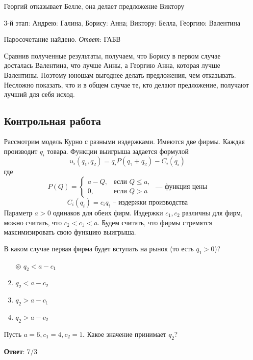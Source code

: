 	Георгий отказывает Белле, она делает предложение Виктору
	
	3-й этап: Андрею: Галина, Борису: Анна; Виктору: Белла, Георгию: Валентина
	
	Паросочетание найдено. \textit{Ответ}: ГАБВ
	
	Сравнив полученные результаты, получаем, что Борису в первом случае досталась Валентина, что лучше Анны, а Георгию Анна, которая лучше Валентины. Поэтому юношам выгоднее делать предложения, чем отказывать. Несложно показать, что и в общем случае те, кто делают предложение, получают лучший для себя исход.
	
	
	
	
	
	
	
\subsection{Контрольная работа}

\task
Рассмотрим модель Курно с разными издержками. Имеются две фирмы. Каждая производит $q_i$ товара. Функции выигрыша задается формулой
\[
	u_i (q_1, q_2) = q_i P(q_1 + q_2) - C_i (q_i)
\]
где
\[
P(Q) =
	\begin{cases}
	a - Q, & \text{если } Q \leq a, \\
	0, & \text{если } Q > a
	\end{cases} \text{ --- функция цены}
\]
\[
	C_i (q_i) = c_i q_i \text{ -- издержки производства}
\]
Параметр $a > 0$ одинаков для обеих фирм. Издержки $c_1, c_2$ различны для фирм, можно считать, что $c_2 < c_1 < a$. Будем считать, что фирмы стремятся максимизировать свою функцию выигрыша.

В каком случае первая фирма будет вступать на рынок (то есть $q_1 > 0$)?

\begin{enumerate}[label=$\circ$]
	\item[$\circledcirc$] $q_2 < a - c_1$
	\item $q_2 < a - c_2$
	\item $q_2 > a - c_1$
	\item $q_2 > a - c_2$
\end{enumerate}

\solution %

\task
Пусть $a = 6, c_1 = 4, c_2 = 1$. Какое значение принимает $q_2$?

\textbf{Ответ}: 
7/3

\solution %

